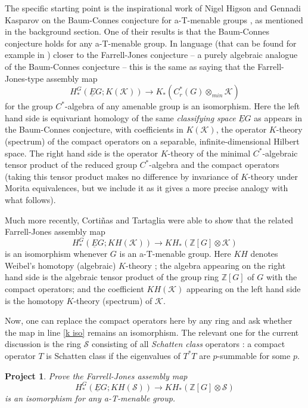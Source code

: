 \documentclass[11pt]{article}
\newcommand{\Z}{\mathbb{Z}}
\theoremstyle{plain}
\newtheorem{project}[theorem]{Project}
\theoremstyle{definition}
\theoremstyle{remark}
\begin{document}
The specific starting point is the inspirational work of Nigel Higson and Gennadi Kasparov on the Baum-Connes conjecture for a-T-menable groups \cite{Higson:2001eb}, as mentioned in the background section.  One of their results is that the Baum-Connes conjecture holds for any a-T-menable group.  In language (that can be found for example in \cite{Davis:1998qf}) closer to the Farrell-Jones conjecture -- a purely algebraic analogue of the Baum-Connes conjecture -- this is the same as saying that the Farrell-Jones-type assembly map
 $$
 H^G_*(\underline{E}G;K(\mathcal{K})) \to K_*(C^*_r(G)\otimes_{min} \mathcal{K})
 $$
for the group $C^*$-algebra of any amenable group is an isomorphism.  Here the left hand side is equivariant homology of the same \emph{classifying space} $\underline{E}G$ as appears in the Baum-Connes conjecture, with coefficients in $K(\mathcal{K})$,  the operator $K$-theory (spectrum) of the compact operators on a separable, infinite-dimensional Hilbert space.  The right hand side is the operator $K$-theory of the minimal $C^*$-algebraic tensor product of the reduced group $C^*$-algebra and the compact operators (taking this tensor product makes no difference by invariance of $K$-theory under Morita equivalences, but we include it as it gives a more precise analogy with what follows).
 
 Much more recently, Corti\~{n}as and Tartaglia were able to show that the related Farrell-Jones assembly map 
 \begin{equation}\label{k iso}
 H^G_*(\underline{E}G;KH(\mathcal{K})) \to KH_*(\Z[G]\otimes \mathcal{K})
 \end{equation}
is an isomorphism whenever $G$ is an a-T-menable group.  Here $KH$ denotes Weibel's homotopy (algebraic) $K$-theory \cite[Section IV.12]{Weibel:2013bf}; the algebra appearing on the right hand side is the algebraic tensor product of the group ring $\Z[G]$ of $G$ with the compact operators; and the coefficient $KH(\mathcal{K})$ appearing on the left hand side is the homotopy $K$-theory (spectrum) of $\mathcal{K}$.  
 
Now, one can replace the compact operators here by any ring and ask whether the map in line \eqref{k iso} remains an isomorphism.  The relevant one for the current discussion is the ring $\mathcal{S}$ consisting of all \emph{Schatten class} operators \cite[Chapter 2]{Simon:2005aa}: a compact operator $T$ is Schatten class if the eigenvalues of $T^*T$ are $p$-summable for some $p$.
 
 \begin{project}
 Prove the Farrell-Jones assembly map
 \begin{equation}\label{s iso}
 H^G_*(\underline{E}G;KH(\mathcal{S})) \to KH_*(\Z[G]\otimes \mathcal{S})
 \end{equation}
 is an isomorphism for any a-T-menable group.
 \end{project}
 
\end{document}
